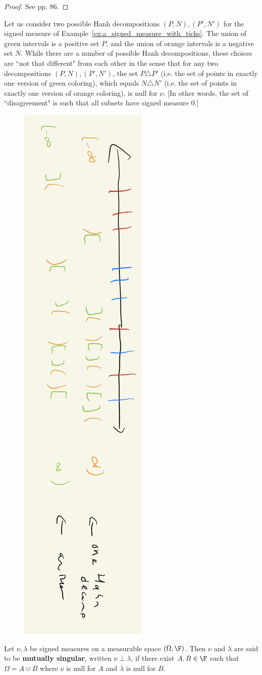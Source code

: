 \documentclass{article} %
\begin{document}
\begin{proof}
See \cite{folland1999real} pp. 86.	
\end{proof}

\begin{example}
Let us consider two possible Hanh decompositions $(P,N), (P',N')$ for the signed measure of Example~\ref{ex:a_signed_measure_with_ticks}. The union of green intervals is a positive set $P$, and the union of orange intervals is a negative set $N$.  While there are a number of possible Hanh decompositions, these choices are ``not that different" from each other in the sense that for any two decompositions $(P,N), (P',N')$, the set $P \triangle P'$ (i.e. the set of points in exactly one version of green coloring), which equals $N \triangle N'$ (i.e. the set of points in exactly one version of orange coloring), is null for $\nu$. [In other words, the set of ``disagreement" is such that all subsets have signed measure 0.]  
\begin{figure}[H]
\centering 
\includegraphics[width=.2\linewidth, angle=90]{images/hanh_decomposition_for_the_signed_measure_example_with_ticks}
\end{figure}
\label{ex:hanh_decomposition_for_the_signed_measure_example_with_ticks}
\end{example}


\begin{definition}
Let $\nu, \lambda$ be signed measures on a measurable space $(\Omega, \F)$.   Then $\nu$ and $\lambda$ are said to be \textbf{mutually singular}, written $\nu \perp \lambda$, if there exist $A,B \in \F$ such that $\Omega = A \cupdot B$ where $\nu$ is null for $A$ and $\lambda$ is null for $B$.
\label{def:mutually_singular}  
\end{definition}
\end{document}
